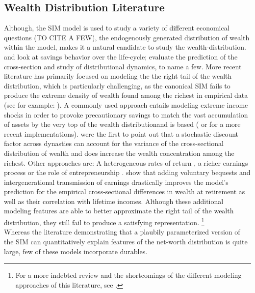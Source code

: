 \documentclass[a4paper,12pt]{article}
\begin{document}
\subsection{Wealth Distribution Literature}
Although, the SIM model is used to study a variety of different economical questions (TO CITE A FEW), the endogenously generated distribution of wealth within the model, makes it a natural candidate to study the wealth-distribution. \\
\cite{Gourinchas&Parker2002} and \cite{cagetti2003} look at savings behavior over the life-cycle; \cite{castaneda2003} evaluate the prediction of the cross-section and \cite{hintermaier2011} study of distributional dynamics, to name a few. More recent literature has primarily focused on modeling the the right tail of the wealth distribution, which is particularly challenging, as the canonical SIM fails to produce the extreme density of wealth found among the richest in empirical data (see for example: \cite{denardi2017}). A commonly used approach entails modeling extreme income shocks in order to provoke precautionary savings to match the vast accumulation of assets by the very top of the wealth distributionand is based \cite{castaneda2003} (\citep{diaz2010} or \citep{kaymak2016evolution} for a more recent implementations). \cite{krusell1998} were the first to point out that a stochastic discount factor across dynasties can account for the variance of the cross-sectional distribution of wealth and does increase the wealth concentration among the richest. Other approaches are: A heterogeneous rates of return \cite{benhabib2011distribution}, a richer earnings process \citep{denardi2016}  or the role of entrepreneurship \citep{cagetti2009}. \cite{denardi2014} show that adding voluntary bequests and intergenerational transmission of earnings drastically improves the model's prediction for the empirical cross-sectional differences in wealth at retirement as well as their correlation with lifetime incomes.  Although these additional modeling features are able to better approximate the right tail of the wealth distribution, they still fail to produce a satisfying representation. \footnote{For a more indebted review and the shortcomings of the different modeling approaches of this literature, see \citep{denardi2017}.} \\
Whereas the literature demonstrating that a plaubily parameterized version of the SIM can quantitatively explain features of the net-worth distribution is quite large, few of these models incorporate durables.
\end{document}
